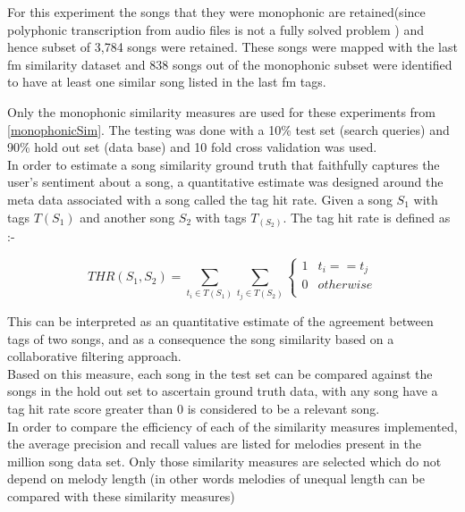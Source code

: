 \noindent For this experiment the songs that they were monophonic are retained(since polyphonic transcription from audio files is not a fully solved problem \cite{melextract}) and hence subset of 3,784 songs were retained. These songs were mapped with the last fm similarity dataset and 838 songs out of the monophonic subset were identified to have at least one similar song listed in the last fm tags. 

\noindent Only the monophonic similarity measures are used for these experiments from \ref{monophonicSim}. The testing was done with a 10\% test set (search queries) and 90\% hold out set (data base) and 10 fold cross validation was used. \\

\noindent In order to estimate a song similarity ground truth that faithfully captures the user's sentiment about a song, a quantitative estimate was designed around the meta data associated with a song called the tag hit rate. Given a song $S_1$ with tags $T(S_1)$ and another song $S_2$ with tags $T_(S_2)$. The tag hit rate is defined as :-

\begin{equation} \label{taghitrate}
THR(S_1, S_2) = \sum_{t_i \in T(S_1)} \sum_{t_j \in T(S_2)} \begin{cases} 
      1 & t_i == t_j \\
      0 & otherwise \\  \end{cases}
\end{equation}

\noindent This can be interpreted as an quantitative estimate of the agreement between tags of two songs, and as a consequence the song similarity based on a collaborative filtering approach. \\

\noindent Based on this measure, each song in the test set can be compared against the songs in the hold out set to ascertain ground truth data, with any song have a tag hit rate score greater than 0 is considered to be a relevant song. \\

\noindent In order to compare the efficiency of each of the similarity measures implemented, the average precision and recall values are listed for melodies present in the million song data set. Only those similarity measures are selected which do not depend on melody length (in other words melodies of unequal length can be compared with these similarity measures) \\

